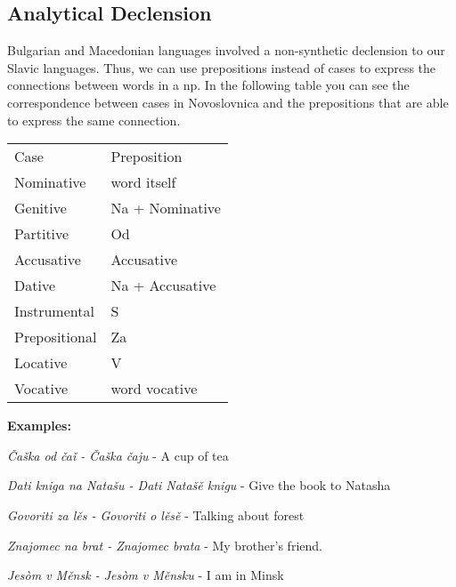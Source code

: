 \subsection{Analytical Declension}

Bulgarian and Macedonian languages involved a non-synthetic declension to our Slavic languages. Thus, we can use prepositions instead of cases to express the connections between words in a \gls{np}. In the following table you can see the correspondence between cases in Novoslovnica and the prepositions that are able to express the same connection.

\begin{table}[!htb]
	\begin{tabular}{ll}
		Case & Preposition \\
		Nominative & word itself \\
		Genitive & Na + Nominative \\
		Partitive & Od \\
		Accusative & Accusative \\
		Dative & Na + Accusative \\
		Instrumental & S \\
		Prepositional & Za \\
		Locative & V \\
		Vocative & word vocative
	\end{tabular}
\end{table}

\textbf{Examples:}

\textit{Čaška od čaǐ - Čaška čaju }- A cup of tea

\textit{Dati kniga na Natašu - Dati Natašě knigu} - Give the book to Natasha

\textit{Govoriti za lěs - Govoriti o lěsě} - Talking about forest

\textit{Znajomec na brat - Znajomec brata} - My brother's friend.

\textit{Jesòm v Měnsk - Jesòm v Měnsku} - I am in Minsk